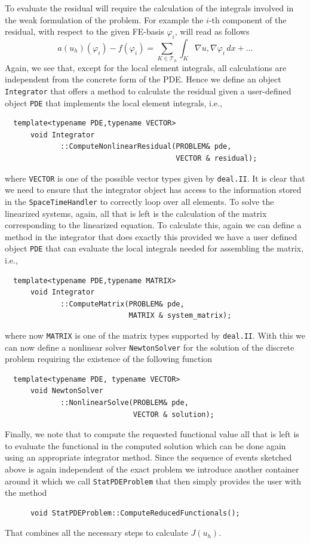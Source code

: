 \documentclass[prodmode,acmtoms]{acmsmall}
\numberwithin{equation}{section}
\renewcommand{\phi}{\varphi}
\newcommand{\deal}{\texttt{deal.II}}
\begin{document}
To evaluate the residual will require the calculation of the integrals 
involved in the weak formulation of the problem. For example 
the $i$-th component of the residual, with respect to the given FE-basis 
$\phi_i$, will read as follows
\[
 a(u_h)(\phi_i) - f(\phi_i) = \sum_{K\in \mathcal T_h} \int_K \nabla u, \nabla \phi_i\,dx + \ldots
\]
Again, we see that, except for the local element integrals, all 
calculations are independent from the concrete form of the PDE. 
Hence we define an object \texttt{Integrator}
that offers a method to calculate the residual given a user-defined 
object \texttt{PDE} that implements the local element integrals, i.e.,
\begin{lstlisting}
  template<typename PDE,typename VECTOR>
      void Integrator
             ::ComputeNonlinearResidual(PROBLEM& pde, 
                                        VECTOR & residual);
\end{lstlisting}
where \texttt{VECTOR} is one of the possible vector types given by \deal.
It is clear that we need to ensure that the integrator object has access
to the information stored in the \texttt{SpaceTimeHandler}
to correctly loop over all elements.
To solve the linearized systems, again, all that is left is the calculation
of the matrix corresponding to the linearized equation. To calculate this,
again we can define a method in the integrator that does exactly this provided
we have a user defined object \texttt{PDE} that can evaluate the local 
integrals needed for assembling the matrix, i.e.,
\begin{lstlisting}
  template<typename PDE,typename MATRIX>
      void Integrator
             ::ComputeMatrix(PROBLEM& pde, 
                             MATRIX & system_matrix);
\end{lstlisting}
where now \texttt{MATRIX} is one of the matrix types supported by \deal.
With this we can now define a nonlinear solver \texttt{NewtonSolver} 
for the solution of the discrete problem requiring the existence of the 
following function
\begin{lstlisting}
  template<typename PDE, typename VECTOR>
      void NewtonSolver
             ::NonlinearSolve(PROBLEM& pde, 
                              VECTOR & solution);
\end{lstlisting}

Finally, we note that to compute the requested functional value 
all that is left is to evaluate the functional in the computed solution 
which can be done again using an appropriate integrator method.
Since the sequence of events sketched above is again independent of the 
exact problem we introduce another container around it which we call 
\texttt{StatPDEProblem} that then simply provides the user with the 
method
\begin{lstlisting}
      void StatPDEProblem::ComputeReducedFunctionals();
\end{lstlisting}
That combines all the necessary steps to calculate $J(u_h)$. 
\end{document}
